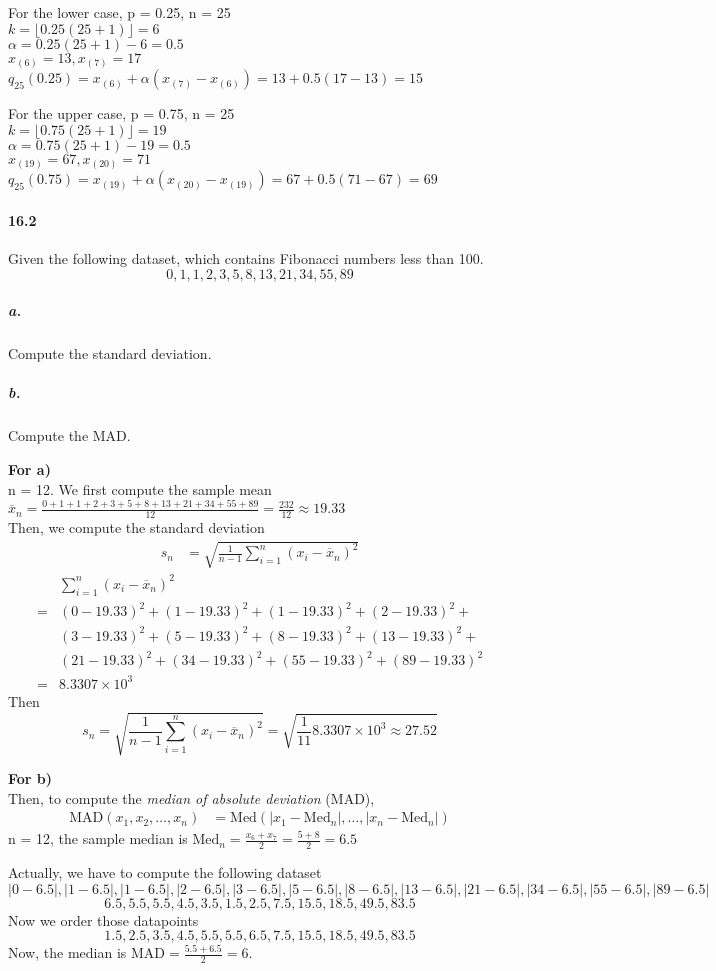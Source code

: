 \documentclass[11pt]{article} %
\begin{document}
For the lower case, p = 0.25, n = 25 \\
$k = \lfloor 0.25 (25 + 1) \rfloor = 6$\\
$\alpha = 0.25(25 + 1) - 6 = 0.5 $\\
$x_{(6)} = 13, x_{(7)} = 17$\\
$q_{25}(0.25) =  x_{(6)} + \alpha \left( x_{(7)} - x_{(6)}\right) = 13 + 0.5(17-13) = 15  $

For the upper case, p = 0.75, n = 25 \\
$k = \lfloor 0.75 (25 + 1) \rfloor = 19$\\
$\alpha = 0.75(25 + 1) - 19 = 0.5 $\\
$x_{(19)} = 67, x_{(20)} = 71$\\
$q_{25}(0.75) =  x_{(19)} + \alpha \left( x_{(20)} - x_{(19)}\right) = 67 + 0.5(71-67) = 69 $

\paragraph*{16.2} Given the following dataset, which contains Fibonacci numbers less than 100. 
$$
0, 1, 1, 2, 3, 5, 8, 13, 21, 34, 55, 89
$$
\subparagraph*{a.} Compute the standard deviation. 
\subparagraph*{b.} Compute the MAD. 

{\bf For a)}\\
n = 12. We first compute the sample mean $\overline{x}_n = \frac{0+1+1+ 2+3+5+8+13+21+34+55+89}{12}=\frac{232}{12}\approx 19.33$ \\
Then, we compute the standard deviation 
\begin{align*}
s_n  &= \sqrt{\frac{1}{n-1}\sum_{i=1}^n\left(x_i - \overline{x}_n \right)^2} 
\end{align*}
\begin{align*}
 & \sum_{i=1}^n\left(x_i - \overline{x}_n \right)^2 \\
= & (0-19.33)^2 + (1-19.33)^2 + (1-19.33)^2 + (2-19.33)^2+ \\
& (3-19.33)^2 +(5-19.33)^2 +(8-19.33)^2+(13-19.33)^2+\\
& (21-19.33)^2+(34-19.33)^2+(55-19.33)^2+( 89-19.33)^2 \\
=& 8.3307\times 10^3
\end{align*}
Then
$$
s_n  = \sqrt{\frac{1}{n-1}\sum_{i=1}^n\left(x_i - \overline{x}_n \right)^2}  = 
\sqrt{\frac{1}{11}8.3307\times 10^3 \approx 27.52}
$$

{\bf For b)} \\
Then, to compute the {\it median of absolute deviation} (MAD), 
\begin{align*}
\text{MAD}(x_1, x_2, \ldots, x_n)&  = \text{Med}\left( |x_1 - \text{Med}_n|, \ldots, |x_n - \text{Med}_n|\right)
\end{align*}
n = 12, the sample median is $\text{Med}_n = \frac{x_6 + x_7}{2} = \frac{5+8}{2}=6.5$

Actually, we have to compute the following dataset
$$
|0-6.5|, |1-6.5|, |1-6.5|, |2-6.5|, |3-6.5|, |5-6.5|, |8-6.5|, |13-6.5|, |21-6.5|, |34-6.5|, |55-6.5|, |89-6.5| 
$$
$$
6.5, 5.5, 5.5, 4.5, 3.5, 1.5, 2.5, 7.5, 15.5, 18.5, 49.5, 83.5 
$$
Now we order those datapoints
$$
1.5, 2.5,3.5,4.5,5.5, 5.5, 6.5, 7.5, 15.5, 18.5, 49.5, 83.5 
$$
Now, the median is $\text{MAD}=\frac{5.5+6.5}{2}=6$. 
\end{document}

